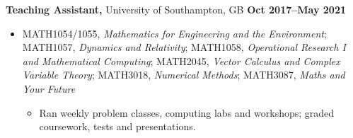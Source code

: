 \textbf{Teaching Assistant,} University of Southampton, GB
\hfill \textbf{Oct 2017--May 2021}%
%
\vspace*{0.05in}
\begin{itemize}
    \item[] MATH1054/1055, \textit{Mathematics for Engineering and the Environment};
    MATH1057, \textit{Dynamics and Relativity};
    MATH1058, \textit{Operational Research I and Mathematical Computing};
    MATH2045, \textit{Vector Calculus and Complex Variable Theory};
    MATH3018, \textit{Numerical Methods};
    MATH3087, \textit{Maths and Your Future}
    \begin{itemize}[nosep]
        \item[] Ran weekly problem classes, computing labs and workshops;
        graded coursework, tests and presentations.
    \end{itemize}
\end{itemize}

